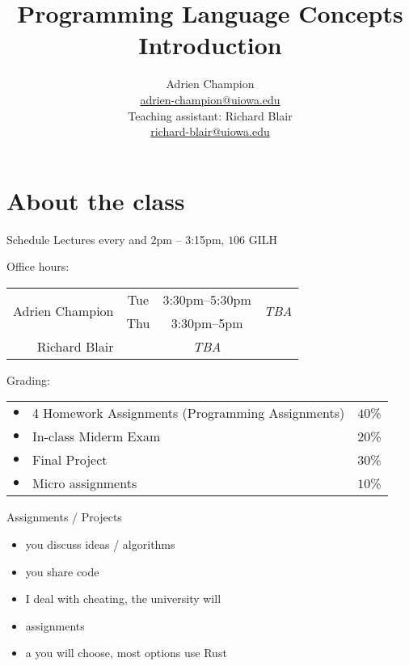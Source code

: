\documentclass[10pt]{beamer}
\title{
  Programming Language Concepts\\[3em]
  Introduction\\[2em]
}
\author[]{
  Adrien Champion \\
  \href{mailto:adrien-champion@uiowa.edu}{adrien-champion@uiowa.edu}\\[4pt]
  Teaching assistant: Richard Blair \\
  \href{mailto:richard-blair@uiowa.edu}{richard-blair@uiowa.edu}
}
\date{}
\begin{document}
\addtolength{\leftmargin}{-20pt}
\addtolength{\rightmargin}{-20pt}



\begin{frame}{}
  \titlepage
\end{frame}



\section{About the class}


\begin{frame}{Schedule}
  Lectures every  and  2pm -- 3:15pm, $106$ GILH
  \bigskip

  Office hours:
  \begin{center}
    \begin{tabular}{r | c c c}
      \multirow{2}{*}{Adrien Champion} &
        Tue &
        3:30pm--5:30pm &
        \multirow{2}{*}{\textit{TBA}} \\
      &
        Thu &
        3:30pm--5pm \\ \hline
      Richard Blair & & \textit{TBA}
    \end{tabular}
  \end{center}
  \bigskip

  Grading:
  \begin{center}
    \begin{tabular}{c l c}
      $\bullet$ & 4 Homework Assignments (Programming Assignments) & $40$\%\\
      $\bullet$ & In-class Miderm Exam & $20$\%\\
      $\bullet$ & Final Project & $30$\%\\
      $\bullet$ & Micro assignments & $10$\%
    \end{tabular}
  \end{center}
\end{frame}





\begin{frame}{Assignments / Projects}

\begin{itemize}
  \bigsep
  \item you  discuss ideas / algorithms
  \item you  share code
  \item I  deal with cheating, the university will
\end{itemize}
\bigskip

\pause

\begin{itemize}
  \item assignments 
  \item a  you will choose, most options use Rust
\end{itemize}

\end{frame}
\end{document}
